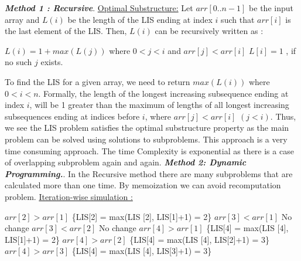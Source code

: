 \documentclass[12pt]{book}
\begin{document}
\textbf{\textit{Method 1 : Recursive}}\newline\newline .
\underline{Optimal Substructure:}\newline
Let $arr[0..n-1]$ be the input array and $L(i)$ be the length of the LIS ending at index $i$ such that $arr[i]$ is the last element of the LIS.\newline
Then, $L(i)$ can be recursively written as : \newline\newline
\begin{center}
$L(i) = 1 + max( L(j) )$ where $0 < j < i$ and $arr[j] < arr[i]$\newline
$L[i] = 1$ , if no such  $j$ exists.\newline\newline
\end{center}
To find the LIS for a given array, we need to return $max(L(i))$ where $0 < i < n$.\newline
Formally, the length of the longest increasing subsequence ending at index $i$, will be 1 greater than the maximum of lengths of all longest increasing subsequences ending at indices before $i$, where $arr[j] < arr[i]$ $(j < i)$. Thus, we see the LIS problem satisfies the optimal substructure property as the main problem can be solved using solutions to subproblems.\newline
This approach is a very time consuming approach. The time Complexity is exponential as there is a case of overlapping subproblem again and again.\newline\newline
\textbf{\textit{Method 2: Dynamic Programming.}}\newline\newline .
In the Recursive method there are many subproblems that are calculated more than one time. By memoization we can avoid recomputation problem.\newline
\underline{Iteration-wise simulation :}
\newline
\begin{center}
$arr[2] > arr[1]$ \{LIS[2] = max(LIS [2], LIS[1]+1) = 2\}\newline\newline
$arr[3] < arr[1]$ {No change}\newline\newline
$arr[3] < arr[2]$ {No change}\newline\newline
$arr[4] > arr[1]$ \{LIS[4] = max(LIS [4], LIS[1]+1) = 2\}\newline\newline
$arr[4] > arr[2]$ \{LIS[4] = max(LIS [4], LIS[2]+1) = 3\}\newline\newline
$arr[4] > arr[3]$ \{LIS[4] = max(LIS [4], LIS[3]+1) = 3\}\newline\newline
\end{center}
\end{document}
